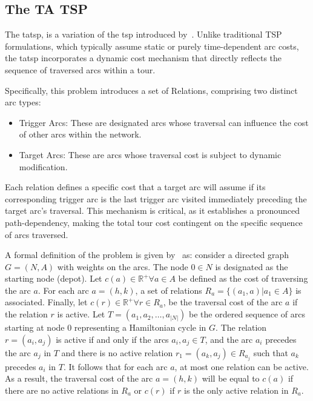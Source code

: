 \documentclass[twocolumn, switch]{article} %
\begin{document}
\subsection{The TA TSP}

The \gls{tatsp}, is a variation of the \gls{tsp} introduced by~\cite{Cerrone}. 
Unlike traditional TSP formulations, which typically assume static or purely time-dependent arc costs, 
the \gls{tatsp} incorporates a dynamic cost mechanism that directly reflects the sequence of traversed arcs within a tour.

Specifically, this problem introduces a set of Relations, comprising two distinct arc types:
\begin{itemize}
\item Trigger Arcs: These are designated arcs whose traversal can influence the cost of other arcs within the network.
\item Target Arcs: These are arcs whose traversal cost is subject to dynamic modification.
\end{itemize}
Each relation defines a specific cost that a target arc will assume if its corresponding trigger arc is the last trigger 
arc visited immediately preceding the target arc's traversal. This mechanism is critical, as it establishes a pronounced 
path-dependency, making the total tour cost contingent on the specific sequence of arcs traversed.

A formal definition of the problem is given by~\cite{Cerrone} as:
consider a directed graph $G = (N,A)$ with weights on the arcs. 
The node $0 \in N$ is designated as the starting node (depot). Let $c(a) \in \mathbb{R}^+ \forall a \in A$ 
be defined as the cost of traversing the arc $a$. For each arc $a=(h, k)$, a set of relations $R_a = \{(a_1, a)| a_1 \in A\}$ 
is associated. Finally, let $c(r) \in \mathbb{R}^+ \forall r \in R_a$, be the traversal cost of the arc $a$ if the relation $r$ 
is active. Let $T = (a_1, a_2, \ldots, a_{|N|})$ be the ordered sequence of arcs starting at node $0$ representing a Hamiltonian 
cycle in $G$. The relation $r = (a_i, a_j)$ is active if and only if the arcs $a_i, a_j \in T$, and the arc $a_i$ precedes the arc 
$a_j$ in $T$ and there is no active relation $r_1 = (a_k, a_j) \in R_{a_j}$ such that $a_k$ precedes $a_i$ in $T$. It follows that 
for each arc $a$, at most one relation can be active. As a result, the traversal cost of the arc $a = (h, k)$ will be equal to $c(a)$ 
if there are no active relations in $R_a$ or $c(r)$ if $r$ is the only active relation in $R_a$.
\end{document}
